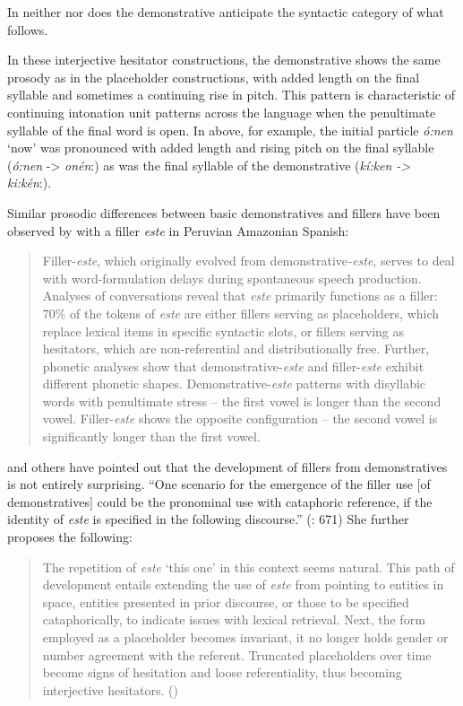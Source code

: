\documentclass[output=paper]{langscibook}
\begin{document}
In neither  nor  does the demonstrative anticipate the syntactic category of what follows.

In these interjective hesitator constructions, the demonstrative shows the same prosody as in the placeholder constructions, with added length on the final syllable and sometimes a continuing rise in pitch. This pattern is characteristic of continuing intonation unit patterns across the language when the penultimate syllable of the final word is open. In  above, for example, the initial particle \textit{ó:nen} ‘now’ was pronounced with added length and rising pitch on the final syllable (\textit{ó:nen} -> \textit{onén}:) as was the final syllable of the demonstrative (\textit{kí:ken -> ki:kén}:). 

Similar prosodic differences between basic demonstratives and fillers have been observed by \citet{Vallejos-Yopán2023} with a filler \textit{este} in Peruvian Amazonian Spanish:

\begin{quote}
Filler-\textit{este}, which originally evolved from demonstrative\textit{{}-este}, serves to deal with word-formulation delays during spontaneous speech production. Analyses of conversations reveal that \textit{este} primarily functions as a filler: 70\% of the tokens of \textit{este} are either fillers serving as placeholders, which replace lexical items in specific syntactic slots, or fillers serving as hesitators, which are non-referential and distributionally free. Further, phonetic analyses show that demonstrative-\textit{este} and filler-\textit{este} exhibit different phonetic shapes. Demonstrative-\textit{este} patterns with disyllabic words with penultimate stress – the first vowel is longer than the second vowel. Filler-\textit{este} shows the opposite configuration – the second vowel is significantly longer than the first vowel. \citep[651]{Vallejos-Yopán2023}
\end{quote}

\citeauthor{Vallejos-Yopán2023} and others have pointed out that the development of fillers from demonstratives is not entirely surprising. “One scenario for the emergence of the filler use [of demonstratives] could be the pronominal use with cataphoric reference, if the identity of \textit{este} is specified in the following discourse.” (\citeyear{Vallejos-Yopán2023}: 671) She further proposes the following:

\begin{quote}
The repetition of \textit{este} ‘this one’ in this context seems natural. This path of development entails extending the use of \textit{este} from pointing to entities in space, entities presented in prior discourse, or those to be specified cataphorically, to indicate issues with lexical retrieval. Next, the form employed as a placeholder becomes invariant, it no longer holds gender or number agreement with the referent. Truncated placeholders over time become signs of hesitation and loose referentiality, thus becoming interjective hesitators. (\citeyear[671]{Vallejos-Yopán2023})
\end{quote}
\end{document}

